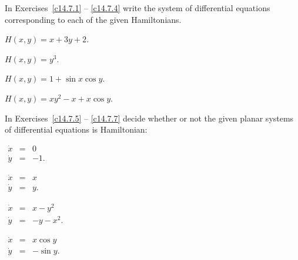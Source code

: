 \documentclass{ximera}
\begin{document}
\TEXER


\noindent In Exercises~\ref{c14.7.1} -- \ref{c14.7.4} write the system of 
differential equations corresponding to each of the given Hamiltonians. 
\begin{exercise} \label{c14.7.1}
$H(x,y) = x+3y+2$.
\end{exercise}
\begin{exercise} \label{c14.7.2}
$H(x,y) = y^3$.
\end{exercise}
\begin{exercise} \label{c14.7.3}
$H(x,y) = 1 + \sin x \cos y$.
\end{exercise}
\begin{exercise} \label{c14.7.4}
$H(x,y) = xy^2 - x + x\cos y$.
\end{exercise}

\noindent In Exercises~\ref{c14.7.5} -- \ref{c14.7.7} decide whether or not  
the given planar systems of differential equations is Hamiltonian:
\begin{exercise} \label{c14.7.5}
$\begin{array}{rcl}
\dot{x} & = & 0 \\
\dot{y} & = & -1.
\end{array}$
\end{exercise}
\begin{exercise} \label{c14.7.6}
$\begin{array}{rcl}
\dot{x} & = & x\\
\dot{y} & = & y.
\end{array}$
\end{exercise}
\begin{exercise} \label{c14.7.6a}
$\begin{array}{rcl}
\dot{x} & = & x - y^2\\
\dot{y} & = & -y - x^2.
\end{array}$
\end{exercise}
\begin{exercise} \label{c14.7.7}
$\begin{array}{rcl}
\dot{x} & = & x\cos y\\
\dot{y} & = & -\sin y.
\end{array}$
\end{exercise}
\end{document}
